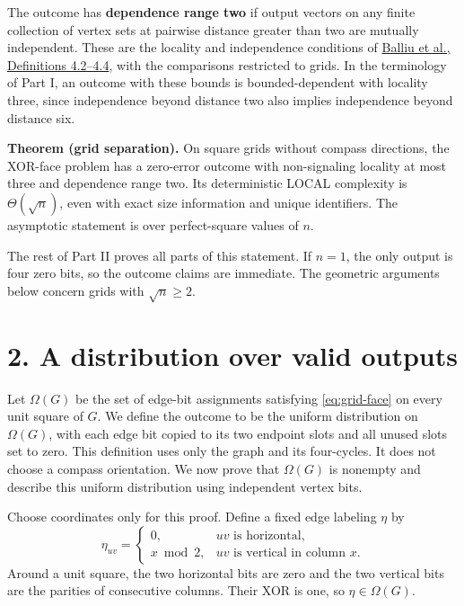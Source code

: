 \documentclass[11pt,a4paper]{article}
\begin{document}
The outcome has \textbf{dependence range two} if output vectors on any finite collection of vertex sets at pairwise distance greater than two are mutually independent.
These are the locality and independence conditions of \href{https://arxiv.org/html/2504.05191v2\#S4}{Balliu et al., Definitions 4.2--4.4}, with the comparisons restricted to grids.
In the terminology of Part I, an outcome with these bounds is bounded-dependent with locality three, since independence beyond distance two also implies independence beyond distance six.

\textbf{Theorem (grid separation).}
On square grids without compass directions, the XOR-face problem has a zero-error outcome with non-signaling locality at most three and dependence range two.
Its deterministic LOCAL complexity is \(\Theta(\sqrt n)\), even with exact size information and unique identifiers.
The asymptotic statement is over perfect-square values of \(n\).

The rest of Part II proves all parts of this statement.
If \(n=1\), the only output is four zero bits, so the outcome claims are immediate.
The geometric arguments below concern grids with \(\sqrt n\ge2\).

\section{2. A distribution over valid outputs}\label{grid-distribution}

Let \(\Omega(G)\) be the set of edge-bit assignments satisfying \eqref{eq:grid-face} on every unit square of \(G\).
We define the outcome to be the uniform distribution on \(\Omega(G)\), with each edge bit copied to its two endpoint slots and all unused slots set to zero.
This definition uses only the graph and its four-cycles.
It does not choose a compass orientation.
We now prove that \(\Omega(G)\) is nonempty and describe this uniform distribution using independent vertex bits.

Choose coordinates only for this proof.
Define a fixed edge labeling \(\eta\) by
\begin{equation} \eta_{uv}=\begin{cases}0,&uv\text{ is horizontal},\\x\bmod2,&uv\text{ is vertical in column }x.\end{cases} \label{eq:grid-reference} \end{equation}
Around a unit square, the two horizontal bits are zero and the two vertical bits are the parities of consecutive columns.
Their XOR is one, so \(\eta\in\Omega(G)\).
\end{document}
